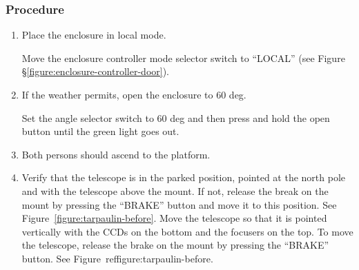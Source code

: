 \subsubsection{Procedure}

\begin{enumerate}

\item
Place the enclosure in local mode.

Move the enclosure controller mode selector switch to “LOCAL” (see Figure \S\ref{figure:enclosure-controller-door}).
\item
If the weather permits, open the enclosure to 60 deg.

Set the angle selector switch to 60 deg and then press and hold the open button until the green light goes out.

\item
Both persons should ascend to the platform.

\item
\ifcoatli
Verify that the telescope is in the parked position, pointed at the north pole and with the telescope above the mount. If not, release the break on the mount by pressing the “BRAKE” button and move it to this position. See Figure~\ref{figure:tarpaulin-before}.
\fi
\ifddoti
Move the telescope so that it is pointed vertically with the CCDs on the bottom and the focusers on the top. To move the telescope, release the brake on the mount by pressing the “BRAKE” button. See Figure~ref{figure:tarpaulin-before}.
\fi


\end{enumerate}
